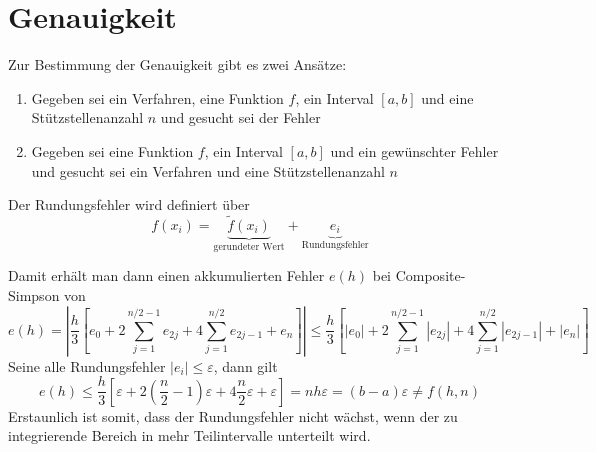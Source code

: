 \section{Genauigkeit}
Zur Bestimmung der Genauigkeit gibt es zwei Ansätze:
\begin{enumerate}
	\item Gegeben sei ein Verfahren, eine Funktion $f$, ein Interval $[a, b]$ und eine Stützstellenanzahl $n$ und gesucht sei der Fehler
	\item Gegeben sei eine Funktion $f$, ein Interval $[a, b]$ und ein gewünschter Fehler und gesucht sei ein Verfahren und eine Stützstellenanzahl $n$
\end{enumerate}

Der Rundungsfehler wird definiert über
\begin{equation}
	f(x_i) = \underbrace{\tilde{f}(x_i)}_{\text{gerundeter Wert}} + \underbrace{e_i}_{\text{Rundungsfehler}}
\end{equation}

Damit erhält man dann einen akkumulierten Fehler $e(h)$ bei Composite-Simpson von
\begin{equation}
	e(h) = \left| \frac{h}{3} \left[ e_0 + 2 \sum_{j = 1}^{n/2 - 1} e_{2j} + 4 \sum_{j = 1}^{n/2} e_{2j - 1} + e_n \right] \right| \le \frac{h}{3} \left[ |e_0| + 2 \sum_{j = 1}^{n/2 - 1} |e_{2j}| + 4 \sum_{j = 1}^{n/2} |e_{2j - 1}| + |e_n| \right]
\end{equation}
Seine alle Rundungsfehler $|e_i| \le \varepsilon$, dann gilt
\begin{equation}
	e(h) \le \frac{h}{3} \left[ \varepsilon + 2(\frac{n}{2} - 1) \varepsilon + 4 \frac{n}{2} \varepsilon + \varepsilon \right] = n h \varepsilon = (b - a) \varepsilon \ne f(h, n)
\end{equation}
Erstaunlich ist somit, dass der Rundungsfehler nicht wächst, wenn der zu integrierende Bereich in mehr Teilintervalle unterteilt wird.